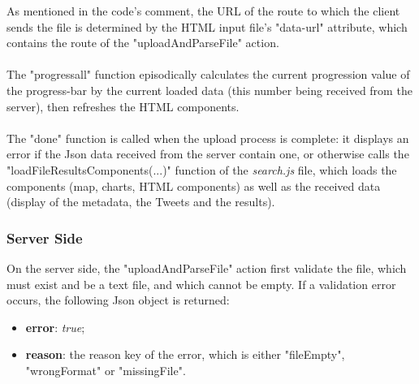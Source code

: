 \documentclass[a4paper,11pt]{report}
\begin{document}
As mentioned in the code's comment, the URL of the route to which the client sends the file is determined by the HTML input file's "data-url" attribute, which contains the route of the "uploadAndParseFile" action.\\\\
The "progressall" function episodically calculates the current progression value of the progress-bar by the current loaded data (this number being received from the server), then refreshes the HTML components.\\\\
The "done" function is called when the upload process is complete: it displays an error if the Json data received from the server contain one, or otherwise calls the "loadFileResultsComponents(...)" function of the \emph{search.js} file, which loads the components (map, charts, HTML components) as well as the received data (display of the metadata, the Tweets and the results).
\bigskip

\subsubsection{Server Side}
On the server side, the "uploadAndParseFile" action first validate the file, which must exist and be a text file, and which cannot be empty. If a validation error occurs, the following Json object is returned:
\begin{itemize}
	\item \textbf{error}: \emph{true};
	\item \textbf{reason}: the reason key of the error, which is either "fileEmpty", "wrongFormat" or "missingFile".
\end{itemize}
\end{document}
